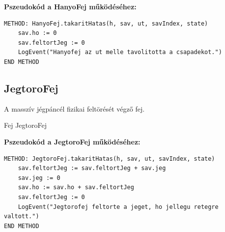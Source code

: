 \textbf{Pszeudokód a HanyoFej működéséhez:}
\begin{verbatim}
METHOD: HanyoFej.takaritHatas(h, sav, ut, savIndex, state)
    sav.ho := 0
    sav.feltortJeg := 0
    LogEvent("Hanyofej az ut melle tavolitotta a csapadekot.")
END METHOD
\end{verbatim}

\subsection{JegtoroFej}
\begin{class-template-responsibility}
    A masszív jégpáncél fizikai feltörését végző fej. 
\end{class-template-responsibility}
\begin{class-template-baseclass}
    Fej \baseclass JegtoroFej
\end{class-template-baseclass}
\begin{class-template-attribute}
\end{class-template-attribute}
\begin{class-template-method}
\end{class-template-method}

\textbf{Pszeudokód a JegtoroFej működéséhez:}
\begin{verbatim}
METHOD: JegtoroFej.takaritHatas(h, sav, ut, savIndex, state)
    sav.feltortJeg := sav.feltortJeg + sav.jeg
    sav.jeg := 0
    sav.ho := sav.ho + sav.feltortJeg
    sav.feltortJeg := 0
    LogEvent("Jegtorofej feltorte a jeget, ho jellegu retegre valtott.")
END METHOD
\end{verbatim}

